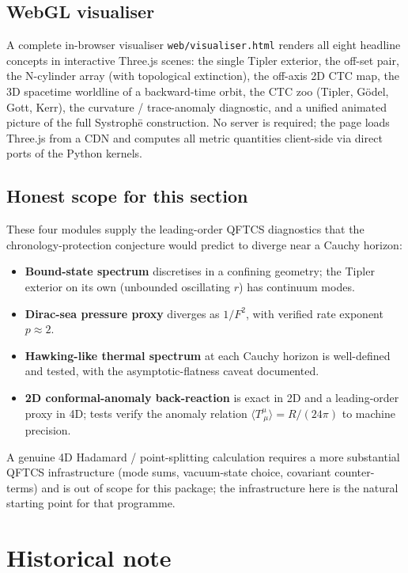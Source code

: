 \documentclass[11pt,a4paper]{article}
\begin{document}
\subsection{WebGL visualiser}

A complete in-browser visualiser \texttt{web/visualiser.html} renders
all eight headline concepts in interactive Three.js scenes: the single
Tipler exterior, the off-set pair, the N-cylinder array (with
topological extinction), the off-axis 2D CTC map, the 3D spacetime
worldline of a backward-time orbit, the CTC zoo (Tipler, G\"odel,
Gott, Kerr), the curvature / trace-anomaly diagnostic, and a unified
animated picture of the full Systroph\=e construction. No server is
required; the page loads Three.js from a CDN and computes all metric
quantities client-side via direct ports of the Python kernels.

\subsection{Honest scope for this section}

These four modules supply the leading-order QFTCS diagnostics that the
chronology-protection conjecture would predict to diverge near a
Cauchy horizon:

\begin{itemize}[leftmargin=*]
\item \textbf{Bound-state spectrum} discretises in a confining
geometry; the Tipler exterior on its own (unbounded oscillating $r$)
has continuum modes.
\item \textbf{Dirac-sea pressure proxy} diverges as $1/F^2$, with
verified rate exponent $p \approx 2$.
\item \textbf{Hawking-like thermal spectrum} at each Cauchy horizon
is well-defined and tested, with the asymptotic-flatness caveat
documented.
\item \textbf{2D conformal-anomaly back-reaction} is exact in 2D and a
leading-order proxy in 4D; tests verify the anomaly relation
$\langle T^\mu_{~\mu} \rangle = R / (24\pi)$ to machine precision.
\end{itemize}

A genuine 4D Hadamard / point-splitting calculation requires a more
substantial QFTCS infrastructure (mode sums, vacuum-state choice,
covariant counter-terms) and is out of scope for this package; the
infrastructure here is the natural starting point for that programme.

\section{Historical note}
\label{sec:historical}
\end{document}
